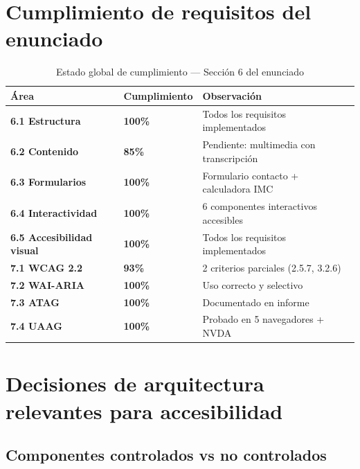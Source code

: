 \documentclass[12pt, a4paper]{article}
\begin{document}
\section{Cumplimiento de requisitos del enunciado}

\begin{table}[H]
\centering
\caption{Estado global de cumplimiento --- Sección 6 del enunciado}
\begin{tabular}{@{}>{\bfseries}p{4cm} >{\centering\arraybackslash}p{2.5cm} p{7cm}@{}}
\toprule
\rowcolor{royalblue!12}
\textbf{Área} & \textbf{Cumplimiento} & \textbf{Observación} \\
\midrule
6.1 Estructura & \textcolor{successgreen}{\bfseries 100\%} & Todos los requisitos implementados \\
6.2 Contenido & \textcolor{warningyellow}{\bfseries 85\%} & Pendiente: multimedia con transcripción \\
6.3 Formularios & \textcolor{successgreen}{\bfseries 100\%} & Formulario contacto + calculadora IMC \\
6.4 Interactividad & \textcolor{successgreen}{\bfseries 100\%} & 6 componentes interactivos accesibles \\
6.5 Accesibilidad visual & \textcolor{successgreen}{\bfseries 100\%} & Todos los requisitos implementados \\
7.1 WCAG 2.2 & \textcolor{warningyellow}{\bfseries 93\%} & 2 criterios parciales (2.5.7, 3.2.6) \\
7.2 WAI-ARIA & \textcolor{successgreen}{\bfseries 100\%} & Uso correcto y selectivo \\
7.3 ATAG & \textcolor{successgreen}{\bfseries 100\%} & Documentado en informe \\
7.4 UAAG & \textcolor{successgreen}{\bfseries 100\%} & Probado en 5 navegadores + NVDA \\
\bottomrule
\end{tabular}
\end{table}

\section{Decisiones de arquitectura relevantes para accesibilidad}

\subsection{Componentes controlados vs no controlados}
\end{document}
